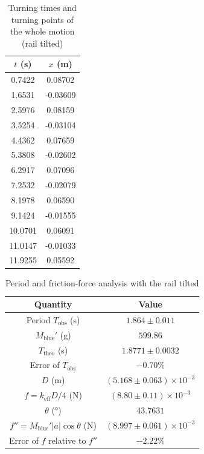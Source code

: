 \begin{table}[htb!]
\centering
\caption{Turning times and turning points of the whole motion (rail tilted)}
\begin{tabular}{cc}
\toprule
$t$ (\unit{\s}) & $x$ (\unit{\m}) \\
\midrule
0.7422 & 0.08702 \\
1.6531 & -0.03609 \\
2.5976 & 0.08159 \\
3.5254 & -0.03104 \\
4.4362 & 0.07659 \\
5.3808 & -0.02602 \\
6.2917 & 0.07096 \\
7.2532 & -0.02079 \\
8.1978 & 0.06590 \\
9.1424 & -0.01555 \\
10.0701 & 0.06091 \\
11.0147 & -0.01033 \\
11.9255 & 0.05592 \\
\bottomrule
\end{tabular}
\end{table}
\begin{table}[htb!]
\centering
\caption{Period and friction-force analysis with the rail tilted}
\begin{tabular}{cc}
\toprule
Quantity & Value \\
\midrule
Period $T_{\text{obs}}$ (\unit{\s}) & $1.864 \pm 0.011$ \\
$M_{\text{blue}}'$ (\unit{\g}) & $599.86$ \\
$T_{\text{theo}}$ (\unit{\s}) & $1.8771 \pm 0.0032$ \\
Error of $T_{\text{obs}}$ & $-0.70\%$ \\
$D$ (\unit{\m}) & $(5.168 \pm 0.063)\times 10^{-3}$ \\
$f=k_{\text{eff}}D/4$ (\unit{\N}) & $(8.80 \pm 0.11)\times 10^{-3}$ \\
$\theta$ (\unit{\degree}) & $43.7631$ \\
$f''=M_{\text{blue}}'|a|\cos\theta$ (\unit{\N}) & $(8.997 \pm 0.061)\times 10^{-3}$ \\
Error of $f$ relative to $f''$ & $-2.22\%$ \\
\bottomrule
\end{tabular}
\end{table}
